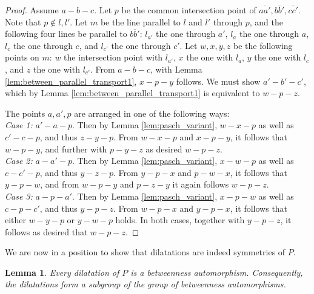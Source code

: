 \documentclass[11pt,a4paper]{article}
\newcommand{\betw}[3]{#1 - #2 - #3}
\newcommand{\lineab}[1]{\overline{#1}}
\newtheorem{lemma}[theorem]{Lemma}
\begin{document}
\begin{proof}
Assume $\betw{a}{b}{c}$. Let $p$ be the common intersection point of $\lineab{aa'}, \lineab{bb'}, \lineab{cc'}$. Note that $p \notin l, l'$. Let $m$ be the line parallel to $l$ and $l'$ through $p$, and the following four lines be parallel to $\lineab{bb'}$: $l_{a'}$ the one through $a'$, $l_a$ the one through $a$, $l_c$ the one through $c$, and $l_{c'}$ the one through $c'$. Let $w, x, y, z$ be the following points on $m$: $w$ the intersection point with $l_{a'}$, $x$ the one with $l_a$, $y$ the one with $l_c$, and $z$ the one with $l_{c'}$. From $\betw{a}{b}{c}$, with Lemma \ref{lem:between_parallel_transport1}, $\betw{x}{p}{y}$ follows. We must show $\betw{a'}{b'}{c'}$, which by Lemma \ref{lem:between_parallel_transport1} is equivalent to $\betw{w}{p}{z}$.

The points $a, a', p$ are arranged in one of the following ways: \\
\textit{Case 1:} $\betw{a'}{a}{p}$. Then by Lemma \ref{lem:pasch_variant}, $\betw{w}{x}{p}$ as well as $\betw{c'}{c}{p}$, and thus $\betw{z}{y}{p}$. From $\betw{w}{x}{p}$ and $\betw{x}{p}{y}$, it follows that $\betw{w}{p}{y}$, and further with $\betw{p}{y}{z}$ as desired $\betw{w}{p}{z}$. \\
\textit{Case 2:} $\betw{a}{a'}{p}$. Then by Lemma \ref{lem:pasch_variant}, $\betw{x}{w}{p}$ as well as $\betw{c}{c'}{p}$, and thus $\betw{y}{z}{p}$. From $\betw{y}{p}{x}$ and $\betw{p}{w}{x}$, it follows that $\betw{y}{p}{w}$, and from $\betw{w}{p}{y}$ and $\betw{p}{z}{y}$ it again follows $\betw{w}{p}{z}$. \\
\textit{Case 3:} $\betw{a}{p}{a'}$. Then by Lemma \ref{lem:pasch_variant}, $\betw{x}{p}{w}$ as well as $\betw{c}{p}{c'}$, and thus $\betw{y}{p}{z}$. From $\betw{w}{p}{x}$ and $\betw{y}{p}{x}$, it follows that either $\betw{w}{y}{p}$ or $\betw{y}{w}{p}$ holds. In both cases, together with $\betw{y}{p}{z}$, it follows as desired that $\betw{w}{p}{z}$.
\end{proof}

We are now in a position to show that dilatations are indeed symmetries of $P$.

\begin{lemma} \label{lem:dilatation_is_automorphism}
Every dilatation of $P$ is a betweenness automorphism. Consequently, the dilatations form a subgroup of the group of betweenness automorphisms.
\end{lemma}
\end{document}
